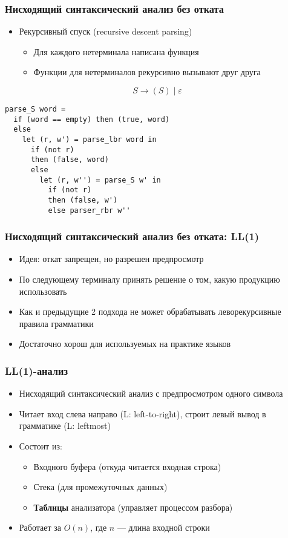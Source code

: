 \documentclass{beamer}
\begin{document}
\begin{frame}[fragile]
  \transwipe[direction=90]
  \frametitle{Нисходящий синтаксический анализ без отката}
  \begin{itemize}
    \item Рекурсивный спуск (recursive descent parsing)
    \begin{itemize}
      \item Для каждого нетерминала написана функция
      \item Функции для нетерминалов рекурсивно вызывают друг друга
    \end{itemize}
  \end{itemize}
  
  \[
  S \to ( S ) \mid \varepsilon
  \]
  
\begin{verbatim}
parse_S word =
  if (word == empty) then (true, word)
  else  
    let (r, w') = parse_lbr word in
      if (not r) 
      then (false, word)
      else 
        let (r, w'') = parse_S w' in
          if (not r) 
          then (false, w')
          else parser_rbr w''
\end{verbatim}
\end{frame}


\begin{frame}[fragile]
  \transwipe[direction=90]
  \frametitle{Нисходящий синтаксический анализ без отката: LL(1)}
  \begin{itemize}
    \item Идея: откат запрещен, но разрешен предпросмотр
    \item По следующему терминалу принять решение о том, какую продукцию использовать
    \item Как и предыдущие 2 подхода не может обрабатывать леворекурсивные правила грамматики
    \item Достаточно хорош для используемых на практике языков
  \end{itemize}
\end{frame}


\begin{frame}[fragile]
  \transwipe[direction=90]
  \frametitle{LL(1)-анализ}
  \begin{itemize}
   \item Нисходящий синтаксический анализ с предпросмотром одного символа
   \item Читает вход слева направо (L: left-to-right), строит левый вывод в грамматике (L: leftmost)
   \item Состоит из:
   \begin{itemize}
     \item Входного буфера (откуда читается входная строка)
     \item Стека (для промежуточных данных)
     \item \textbf{Таблицы} анализатора (управляет процессом разбора)
   \end{itemize}
   \item Работает за $O(n)$, где $n$ --- длина входной строки
  \end{itemize}
\end{frame}
\end{document}
